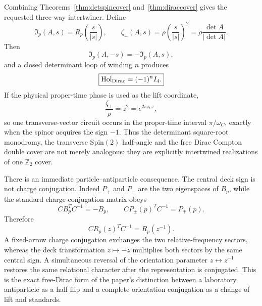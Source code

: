 \documentclass[11pt]{article}
\theoremstyle{definition}\newtheorem{definition}[theorem]{Definition}
\theoremstyle{remark}\newtheorem{remark}[theorem]{Remark}\newtheorem{conjecture}[theorem]{Conjecture}
\begin{document}
Combining Theorems~\ref{thm:detspincover} and~\ref{thm:diraccover} gives the requested three-way intertwiner. Define
\begin{equation}\label{eq:threewayintertwiner}
 \boxed{
 \mathfrak I_p(A,s)
 =R_p\!\left(\frac{s}{|s|}\right),
 \qquad
 \zeta_\perp(A,s)=\rho\left(\frac{s}{|s|}\right)^2
 =\rho\frac{\det A}{|\det A|}.}
\end{equation}
Then
\begin{equation}\label{eq:deckintertwineexact}
 \boxed{
 \mathfrak I_p(A,-s)=-\mathfrak I_p(A,s),}
\end{equation}
and a closed determinant loop of winding $n$ produces
\begin{equation}\label{eq:threewayholonomy}
 \boxed{
 \operatorname{Hol}_{\rm Dirac}=(-1)^n I_4.}
\end{equation}
If the physical proper-time phase is used as the lift coordinate,
\begin{equation}\label{eq:qdoubleclock}
 \frac{\zeta_\perp}{\rho}=z^2=e^{2i\omega_C\tau},
\end{equation}
so one transverse-vector circuit occurs in the proper-time interval $\pi/\omega_C$, exactly when the spinor acquires the sign $-1$. Thus the determinant square-root monodromy, the transverse $\mathrm{Spin}(2)$ half-angle and the free Dirac Compton double cover are not merely analogous: they are explicitly intertwined realizations of one $\mathbb Z_2$ cover.

There is an immediate particle--antiparticle consequence. The central deck sign is not charge conjugation. Indeed $P_+$ and $P_-$ are the two eigenspaces of $B_p$, while the standard charge-conjugation matrix obeys
\begin{equation}\label{eq:CBC}
 C B_p^T C^{-1}=-B_p,
 \qquad
 C P_\pm(p)^T C^{-1}=P_\mp(p).
\end{equation}
Therefore
\begin{equation}\label{eq:CRintertwine}
 \boxed{
 C R_p(z)^T C^{-1}=R_p(z^{-1}).}
\end{equation}
A fixed-arrow charge conjugation exchanges the two relative-frequency sectors, whereas the deck transformation $z\mapsto-z$ multiplies both sectors by the same central sign. A simultaneous reversal of the orientation parameter $z\leftrightarrow z^{-1}$ restores the same relational character after the representation is conjugated. This is the exact free-Dirac form of the paper's distinction between a laboratory antiparticle as a half flip and a complete orientation conjugation as a change of lift and standards.
\end{document}
